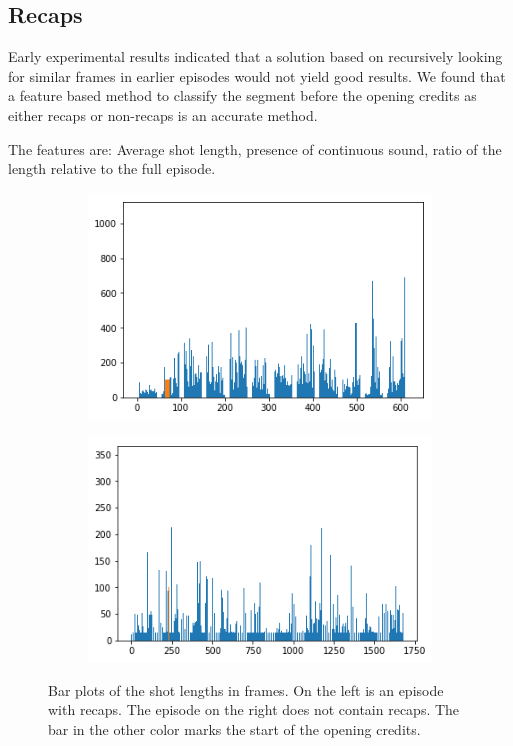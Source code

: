 \documentclass{article}
\begin{document}
\subsection{Recaps}
Early experimental results indicated that a solution based on recursively looking for similar frames in earlier episodes would not yield good results. We found that a feature based method to classify the segment before the opening credits as either recaps or non-recaps is an accurate method. 

The features are: Average shot length, presence of continuous sound, ratio of the length relative to the full episode.

\begin{figure}[H]
	\centering
	\begin{subfigure}[b]{0.4\textwidth}
		\includegraphics[width=\textwidth]{images/shotlengths_recaps_true.png}
	\end{subfigure}
	\begin{subfigure}[b]{0.4\textwidth}
		\includegraphics[width=\textwidth]{images/shotlengths_recaps_false.png}
	\end{subfigure}
	\caption{Bar plots of the shot lengths in frames. On the left is an episode with recaps. The episode on the right does not contain recaps. The bar in the other color marks the start of the opening credits.}
	\label{fig:closingcredits}
\end{figure}
\end{document}
